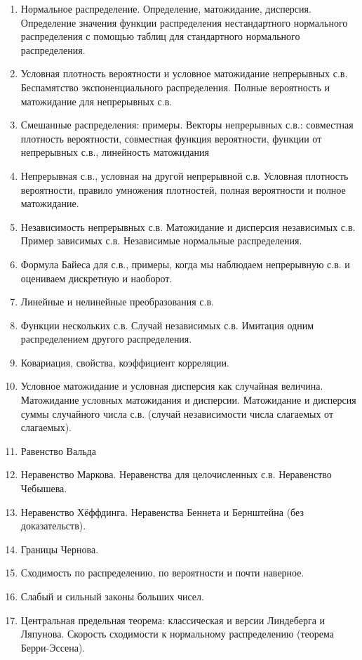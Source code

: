\documentclass[12pt]{article}
\begin{document}
\begin{enumerate}
  \item Нормальное распределение. Определение, матожидание, дисперсия. Определение значения функции распределения нестандартного нормального распределения с помощью таблиц для стандартного нормального распределения.
  \item Условная плотность вероятности и условное матожидание непрерывных с.в. Беспамятство экспоненциального распределения. Полные вероятность и матожидание для непрерывных с.в.
  \item Смешанные распределения: примеры. Векторы непрерывных с.в.: совместная плотность вероятности, совместная функция вероятности, функции от непрерывных с.в., линейность матожидания
  \item Непрерывная с.в., условная на другой непрерывной с.в. Условная плотность вероятности, правило умножения плотностей, полная вероятности и полное матожидание.
  \item Независимость непрерывных с.в. Матожидание и дисперсия независимых с.в. Пример зависимых с.в. Независимые нормальные распределения.
  \item Формула Байеса для с.в., примеры, когда мы наблюдаем непрерывную с.в. и оцениваем дискретную и наоборот.
  \item Линейные и нелинейные преобразования с.в.
  \item Функции нескольких с.в. Случай независимых с.в. Имитация одним распределением другого распределения.
  \item Ковариация, свойства, коэффициент корреляции.
  \item Условное матожидание и условная дисперсия как случайная величина. Матожидание условных матожидания и дисперсии. Матожидание и дисперсия суммы случайного числа с.в. (случай независимости числа слагаемых от слагаемых).
  \item Равенство Вальда
  \item Неравенство Маркова. Неравенства для целочисленных с.в. Неравенство Чебышева.
  \item Неравенство Хёффдинга. Неравенства Беннета и Бернштейна (без доказательств).
  \item Границы Чернова. 
  \item Сходимость по распределению, по вероятности и почти наверное.
  \item Слабый и сильный законы больших чисел.
  \item Центральная предельная теорема: классическая и версии Линдеберга и Ляпунова. Скорость сходимости к нормальному распределению (теорема Берри-Эссена).

\end{enumerate}
\end{document}
